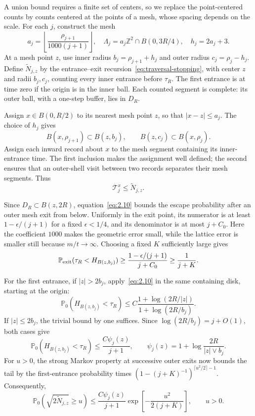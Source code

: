 \documentclass[11pt,letterpaper,reqno]{amsart}
\newif\ifrevmarks \revmarkstrue
\newcommand{\add}[1]{\ifrevmarks\textcolor{revorange}{#1}\else#1\fi}
\numberwithin{equation}{section}
\theoremstyle{remark}
\begin{document}
\add{A union bound requires a finite set of centers, so we replace the point-centered counts by counts centered at the points of a mesh, whose spacing depends on the scale.} For each $j$, construct the mesh
\[
a_j=\left\lfloor\frac{\rho_{j+1}}{1000(j+1)}\right\rfloor,
\quad \Lambda_j=a_j\mathbb Z^2\cap B(0,3R/4),
\quad h_j=2a_j+3.
\]
At a mesh point $z$, use inner radius $b_j=\rho_{j+1}+h_j$ and outer radius $c_j=\rho_j-h_j$. Define $\widetilde N_{j,z}$ by the entrance--exit recursion~\eqref{eq:traversal-stopping}, with center $z$ and radii $b_j,c_j$, counting every inner entrance before $\tau_R$. The first entrance is at time zero if the origin is in the inner ball. Each counted segment is complete: its outer ball, with a one-step buffer, lies in $D_R$.

Assign $x\in B(0,R/2)$ to its nearest mesh point $z$, so that $|x-z|\le a_j$. The choice of $h_j$ gives
\[
B(x,\rho_{j+1})\subset B(z,b_j),
\qquad B(z,c_j)\subset B(x,\rho_j).
\]
Assign each inward record about $x$ to the mesh segment containing its inner-entrance time. The first inclusion makes the assignment well defined; the second ensures that an outer-shell visit between two records separates their mesh segments. Thus
\begin{equation}\label{eq:4.13}
\mathcal T_j^x\le\widetilde N_{j,z}.
\end{equation}

Since $D_R\subset B(z,2R)$, equation~\eqref{eq:2.10} bounds the escape probability after an outer mesh exit from below. Uniformly in the exit point, its numerator is at least
$1-\epsilon/(j+1)$ for a fixed $\epsilon<1/4$, and its denominator is at most $j+C_0$. Here the coefficient $1000$ makes the geometric error small, while the lattice error is smaller still because $m/t\to\infty$. Choosing a fixed $K$ sufficiently large gives
\[
\mathbb P_{\rm exit}(\tau_R<H_{B(z,b_j)})
\ge\frac{1-\epsilon/(j+1)}{j+C_0}
\ge\frac1{j+K}.
\]

For the first entrance, if $|z|>2b_j$, apply~\eqref{eq:2.10} in the same containing disk, starting at the origin:
\[
\mathbb P_0(H_{B(z,b_j)}<\tau_R)
\le C\frac{1+\log(2R/|z|)}{1+\log(2R/b_j)}.
\]
If $|z|\le2b_j$, the trivial bound by one suffices. Since
$\log(2R/b_j)=j+O(1)$, both cases give
\[
\mathbb P_0(H_{B(z,b_j)}<\tau_R)
\le\frac{C\psi_j(z)}{j+1},
\qquad
\psi_j(z)=1+\log\frac{2R}{|z|\vee b_j}.
\]
For $u>0$, the strong Markov property at successive outer exits now bounds the tail by the first-entrance probability times
$(1-(j+K)^{-1})^{\lceil u^2/2\rceil-1}$. Consequently,
\begin{equation}\label{eq:4.14}
\mathbb P_0(\sqrt{2\widetilde N_{j,z}}\ge u)
\le\frac{C\psi_j(z)}{j+1}
\exp\left[-\frac{u^2}{2(j+K)}\right],
\qquad u>0.
\end{equation}
\end{document}
